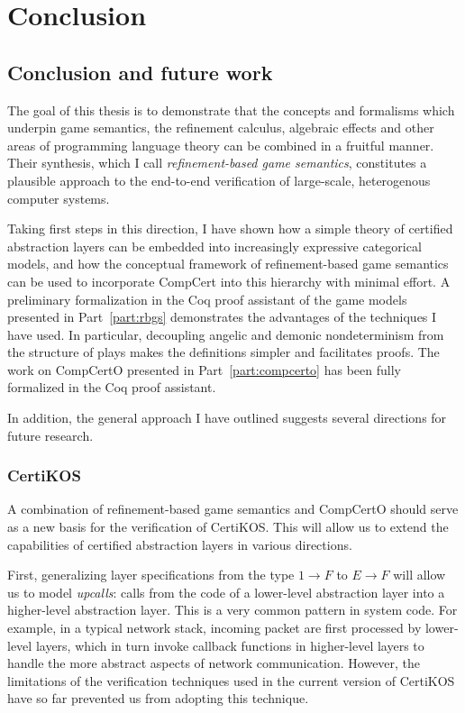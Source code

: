 \documentclass[11pt,oneside,draft]{book}
\theoremstyle{definition}
\begin{document}



\part{Conclusion}

\chapter{Conclusion and future work} %

The goal of this thesis is to demonstrate that
the concepts and formalisms which underpin
game semantics,
the refinement calculus,
algebraic effects and
other areas of programming language theory
can be combined in a fruitful manner.
Their synthesis,
which I call \emph{refinement-based game semantics},
constitutes
a plausible approach to the end-to-end verification
of large-scale, heterogenous computer systems.

Taking first steps in this direction,
I have shown how a simple theory of certified abstraction layers
can be embedded into increasingly expressive categorical models,
and how the conceptual framework of refinement-based game semantics
can be used to incorporate CompCert into this hierarchy
with minimal effort.
A preliminary formalization in the Coq proof assistant
of the game models presented in Part~\ref{part:rbgs}
demonstrates the advantages of the techniques I have used.
In particular,
decoupling angelic and demonic nondeterminism
from the structure of plays
makes the definitions simpler and facilitates proofs.
The work on CompCertO presented in Part~\ref{part:compcerto}
has been fully formalized in the Coq proof assistant.

In addition,
the general approach I have outlined
suggests several directions for future research.

\section{CertiKOS} %

A combination of refinement-based game semantics
and CompCertO
should serve as a new basis
for the verification of CertiKOS.
This will allow us to extend the capabilities
of certified abstraction layers
in various directions.

First,
generalizing layer specifications
from the type $1 \rightarrow F$ to $E \rightarrow F$
will allow us to model \emph{upcalls}:
calls from the code of a lower-level abstraction layer
into a higher-level abstraction layer.
This is a very common pattern in system code.
For example,
in a typical network stack,
incoming packet are first processed by
lower-level layers,
which in turn invoke callback functions in
higher-level layers
to handle the more abstract aspects of
network communication.
However,
the limitations of the verification techniques
used in the current version of CertiKOS
have so far prevented us from adopting this technique.
\end{document}
